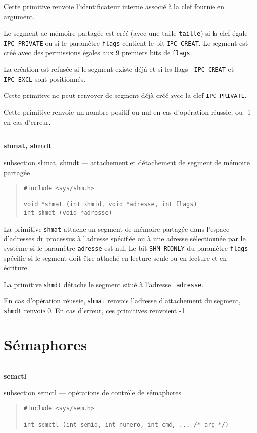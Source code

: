 \documentclass [twoside] {report}
\newcommand {\primitive} [1]
    {
	\phantomsection
	{\large \bf #1}
	\addcontentsline {toc} {subsection} {#1}
    }
\newcommand {\separation}
    {
	\vspace {5mm}
	\nopagebreak
	\hrule
    }
\begin{document}
Cette primitive renvoie l'identificateur interne associé à la clef
fournie en argument.

Le segment de mémoire partagée est créé (avec une taille {\tt taille})
si la clef égale {\tt IPC\_PRIVATE} ou si le paramètre {\tt flags}
contient le bit {\tt IPC\_CREAT}.  Le segment est créé avec des
permissions égales aux 9 premiers bits de {\tt flags}.

La création est refusée si le segment existe déjà et si les flags {\tt
IPC\_CREAT} et {\tt IPC\_EXCL} sont positionnés.

Cette primitive ne peut renvoyer de segment déjà créé avec la clef
{\tt IPC\_PRIVATE}.

Cette primitive renvoie un nombre positif ou nul en cas d'opération
réussie, ou -1 en cas d'erreur.


\separation
\primitive {shmat, shmdt} --- attachement et détachement de segment de mémoire partagée

\begin {quote}
\begin {verbatim}
#include <sys/shm.h>

void *shmat (int shmid, void *adresse, int flags)
int shmdt (void *adresse)
\end{verbatim}
\end {quote}

La primitive {\tt shmat} attache un segment de mémoire partagée dans
l'espace d'adresses du processus à l'adresse spécifiée ou à une adresse
sélectionnée par le système si le paramètre {\tt adresse} est nul. Le
bit {\tt SHM\_RDONLY} du paramètre {\tt flags} spécifie si le segment
doit être attaché en lecture seule ou en lecture et en écriture.

La primitive {\tt shmdt} détache le segment situé à l'adresse {\tt
adresse}.

En cas d'opération réussie, {\tt shmat} renvoie l'adresse d'attachement
du segment, {\tt shmdt} renvoie 0.  En cas d'erreur, ces primitives
renvoient -1.


\section* {Sémaphores}

\separation
\primitive {semctl} --- opérations de contrôle de sémaphores

\begin {quote}
\begin {verbatim}
#include <sys/sem.h>

int semctl (int semid, int numero, int cmd, ... /* arg */)
\end{verbatim}
\end {quote}
\end{document}
